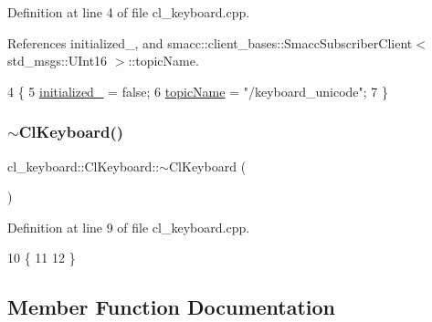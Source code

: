 Definition at line 4 of file cl\+\_\+keyboard.\+cpp.



References initialized\+\_\+, and smacc\+::client\+\_\+bases\+::\+Smacc\+Subscriber\+Client$<$ std\+\_\+msgs\+::\+U\+Int16 $>$\+::topic\+Name.


\begin{DoxyCode}
4                        \{
5   \hyperlink{classcl__keyboard_1_1ClKeyboard_a96128ed5180e0dc5cfe76c90a9f8e8f7}{initialized\_} = \textcolor{keyword}{false};
6   \hyperlink{classsmacc_1_1client__bases_1_1SmaccSubscriberClient_aeadf21a09412c6c9488e5acd50fb4f40}{topicName} = \textcolor{stringliteral}{"/keyboard\_unicode"};
7 \}
\end{DoxyCode}
\mbox{\label{classcl__keyboard_1_1ClKeyboard_af2f4ffb66639acb158d57d627a56d8e8}} 
\subsubsection{\texorpdfstring{$\sim$\+Cl\+Keyboard()}{~ClKeyboard()}}
{\footnotesize\ttfamily cl\+\_\+keyboard\+::\+Cl\+Keyboard\+::$\sim$\+Cl\+Keyboard (\begin{DoxyParamCaption}{ }\end{DoxyParamCaption})\hspace{0.3cm}{\ttfamily [virtual]}}



Definition at line 9 of file cl\+\_\+keyboard.\+cpp.


\begin{DoxyCode}
10 \{
11   
12 \}
\end{DoxyCode}


\subsection{Member Function Documentation}
\mbox{\label{classcl__keyboard_1_1ClKeyboard_af7f7fd9871ef5fcca400cd59d7b60775}} 
